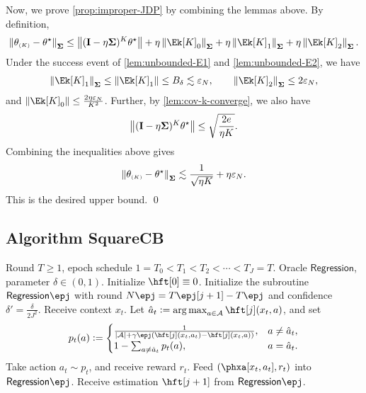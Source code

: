 Now, we prove \cref{prop:improper-JDP} by combining the lemmas above. By definition,
\begin{align*}
    \nrm{\theta\kc-\ths}_{\bSigma}\leq \nrm{(\id-\eta\bSigma)^K\ths}+\eta\nrm{\Ek[K]_0}_{\bSigma}+\eta\nrm{\Ek[K]_1}_{\bSigma}+\eta\nrm{\Ek[K]_2}_{\bSigma}.
\end{align*}
Under the success event of \cref{lem:unbounded-E1} and \cref{lem:unbounded-E2}, we have 
\begin{align*}
    \nrm{\Ek[K]_1}_{\bSigma}\leq \nrm{\Ek[K]_1}\leq B_\delta\leqsim \epsN, \qquad
    \nrm{\Ek[K]_2}_{\bSigma}\leq 2\epsN,
\end{align*}
and $\nrm{\Ek[K]_0}\leq \frac{2\eta\epsN}{K^2}$. Further, by \cref{lem:cov-k-converge}, we also have 
\begin{align*}
    \left\|(\mathbf{I}-\eta\boldsymbol{\Sigma})^K\theta^\star\right\|\leq \sqrt{\frac{2e}{\eta K}}.
\end{align*}
Combining the inequalities above gives
\begin{align*}
    \left\|\theta_{\scriptscriptstyle{ (K) }}-\theta^\star\right\|_{\boldsymbol{\Sigma}}\lesssim \frac{1}{\sqrt{\eta K}}+\eta \varepsilon_N.
\end{align*}
This is the desired upper bound.
\qed

\subsection{Algorithm SquareCB}\label{appdx:square-cb}


\newcommand{\AlgRegression}{\mathsf{Regression}}
\begin{algorithm}
\begin{algorithmic}
\REQUIRE Round $T\geq 1$, epoch schedule $1=T_0<T_1<T_2<\cdots<T_{J}=T$.
\REQUIRE Oracle $\AlgRegression$, parameter $\delta\in(0,1)$.
\STATE Initialize $\hft[0]\equiv 0$.
\STATE Initialize the subroutine $\AlgRegression\epj$ with round $N\epj=T\epj[j+1]-T\epj$ and confidence $\delta'=\frac{\delta}{2J^2}$.
\STATE Receive context $x_t$.
\STATE Let $\hat{a}_t\defeq \argmax_{a\in\cA} \hft[j](x_t,a)$, and set
\begin{align*}
    p_t(a)\defeq \begin{cases}
        \frac{1}{|\cA|+\gamma\epj\paren{\hft[j](x_t,a_t)-\hft[j](x_t,a)}}, & a\neq \hat{a}_t, \\
        1-\sum_{a\neq \hat{a}_t} p_t(a), & a=\hat{a}_t.
    \end{cases}
\end{align*}
\STATE Take action $a_t\sim p_t$, and receive reward $r_t$.
\STATE Feed $(\phxa[x_t,a_t],r_t)$ into $\AlgRegression\epj$.
\ENDFOR
\STATE Receive estimation $\hft[j+1]$ from $\AlgRegression\epj$.
\ENDFOR
\end{algorithmic}
\caption{$\AlgSQCB$~\citep{foster2020beyond,simchi2020bypassing}}\label{alg:square-cb}
\end{algorithm}

